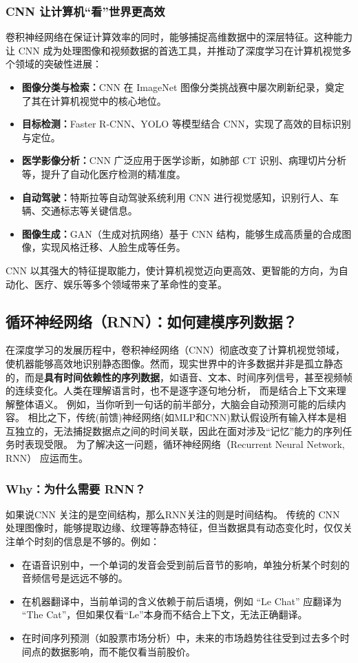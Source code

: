 \subsubsection{  CNN 让计算机“看”世界更高效}

卷积神经网络在保证计算效率的同时，能够捕捉高维数据中的深层特征。这种能力让 CNN 成为处理图像和视频数据的首选工具，并推动了深度学习在计算机视觉多个领域的突破性进展：
\begin{itemize}
\item {\bf  图像分类与检索：}CNN 在 ImageNet 图像分类挑战赛中屡次刷新纪录，奠定了其在计算机视觉中的核心地位。
\item {\bf 目标检测：}Faster R-CNN、YOLO 等模型结合 CNN，实现了高效的目标识别与定位。
\item {\bf 医学影像分析：}CNN 广泛应用于医学诊断，如肺部 CT 识别、病理切片分析等，提升了自动化医疗检测的精准度。
\item {\bf 自动驾驶：}特斯拉等自动驾驶系统利用 CNN 进行视觉感知，识别行人、车辆、交通标志等关键信息。
\item {\bf 图像生成：}GAN（生成对抗网络）基于 CNN 结构，能够生成高质量的合成图像，实现风格迁移、人脸生成等任务。
\end{itemize}
CNN 以其强大的特征提取能力，使计算机视觉迈向更高效、更智能的方向，为自动化、医疗、娱乐等多个领域带来了革命性的变革。

 \subsection{循环神经网络（RNN）：如何建模序列数据？}
在深度学习的发展历程中，卷积神经网络（CNN）彻底改变了计算机视觉领域，使机器能够高效地识别静态图像。然而，现实世界中的许多数据并非是孤立静态的，而是{\bf 具有时间依赖性的序列数据}，如语音、文本、时间序列信号，甚至视频帧的连续变化。人类在理解语言时，也不是逐字逐句地分析， 而是结合上下文来理解整体语义。
例如，当你听到一句话的前半部分，大脑会自动预测可能的后续内容。
相比之下，传统(前馈)神经网络(如MLP和CNN)默认假设所有输入样本是相互独立的，无法捕捉数据点之间的时间关联，因此在面对涉及“记忆”能力的序列任务时表现受限。
为了解决这一问题，循环神经网络（Recurrent Neural Network, RNN） 应运而生。

 \subsubsection{ Why：为什么需要 RNN？}
如果说CNN 关注的是空间结构，那么RNN关注的则是时间结构。
传统的 CNN 处理图像时，能够提取边缘、纹理等静态特征，但当数据具有动态变化时，仅仅关注单个时刻的信息是不够的。例如：
\begin{itemize}
\item 在语音识别中，一个单词的发音会受到前后音节的影响，单独分析某个时刻的音频信号是远远不够的。
\item 在机器翻译中，当前单词的含义依赖于前后语境，例如 “Le Chat” 应翻译为 “The Cat”，但如果仅看“Le”本身而不结合上下文，无法正确翻译。
\item 在时间序列预测（如股票市场分析）中，未来的市场趋势往往受到过去多个时间点的数据影响，而不能仅看当前股价。
\end{itemize}


